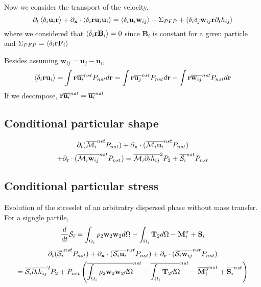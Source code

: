 Now we consider the transport of the velocity, 
\begin{equation*}
    \partial_t \left<\delta_i\textbf{u}_{i}\textbf{r}\right> 
  + \partial_\textbf{x} \cdot \left<\delta_i \textbf{r}\textbf{u}_i\textbf{u}_{i}\right>
  = \left<\delta_i\textbf{u}_{i}\textbf{w}_{ij}\right>
  + \Sigma_{PFP}
  + \left<\delta_i\delta_{j}\textbf{w}_{ij}\textbf{r}\partial_t h_{ij} \right>
\end{equation*}
where we considered that $\left<\delta_i\textbf{r} \textbf{B}_{i}\right> = 0 $ since $\textbf{B}_i$ is constant for a given particle and $\Sigma_{PFP} = \left<\delta_i\textbf{r} \textbf{F}_{i}\right>$ 



Besides assuming $\textbf{w}_{ij} = \textbf{u}_j - \textbf{u}_i$, 
\begin{equation}
    \left<\delta_i \textbf{ru}_{i}\right>
    = 
    \int{\textbf{r}\overline{\textbf{u}_{i}}^{nst}} P_{nst}d\textbf{r}
    = \int{\textbf{r}\overline{\textbf{u}_{j}}^{nst}} P_{nst}d\textbf{r}
    - \int{\textbf{r}\overline{\textbf{w}_{ij}}^{nst}} P_{nst}d\textbf{r}
\end{equation}
If we decompose, $\textbf{r}\overline{\textbf{u}_{i}}^{nst} = \overline{\textbf{u}_{i}}^{nst}$
\subsection{Conditional particular shape}
\begin{multline*}
    \partial_t (\overline{\mathcal{M}_{i}}^{nst} P_{nst}) 
    + \partial_\textbf{x} \cdot ( \overline{\mathcal{M}_{i}\textbf{u}_i}^{nst} P_{nst})\\
    + \partial_\textbf{r} \cdot ( \overline{\mathcal{M}_{i}\textbf{w}_{ij}}^{nst} P_{nst}) 
    = 
    \overline{\mathcal{M}_{i}\partial_t h_{ij}}^{2}P_2
    + \overline{\mathcal{S}_i}^{nst}P_{nst}
\end{multline*}
\subsection{Conditional particular stress}

Evolution of the stresslet of an arbitratry dispersed phase without mass transfer. 
For a signgle partile, 
\begin{equation}    
     \frac{d}{d t} \mathcal{S}_i
    =  \int_{\Omega_i} \rho_2 \textbf{w}_2 \textbf{w}_2d\Omega
    - \int_{\Omega_i}\mathbf{T}_2d\Omega
    -  \textbf{M}_i^\sigma
    +   \textbf{S}_i
\end{equation}
\begin{multline*}
    \partial_t (\overline{\mathcal{S}_{i}}^{nst} P_{nst}) 
    + \partial_\textbf{x} \cdot ( \overline{\mathcal{S}_{i}\textbf{u}_i}^{nst} P_{nst})
    + \partial_\textbf{r} \cdot ( \overline{\mathcal{S}_{i}\textbf{w}_{ij}}^{nst} P_{nst}) \\
    = 
    \overline{\mathcal{S}_{i}\partial_t h_{ij}}^{2}P_2
    + P_{nst}\left(
        \overline{\int_{\Omega_i} \rho_2 \textbf{w}_2 \textbf{w}_2d\Omega}^{nst}
        - \overline{\int_{\Omega_i}\mathbf{T}_2d\Omega}^{nst}
        - \overline{\textbf{M}_i^\sigma}^{nst}
        + \overline{\textbf{S}_i}^{nst}
    \right)
\end{multline*}

